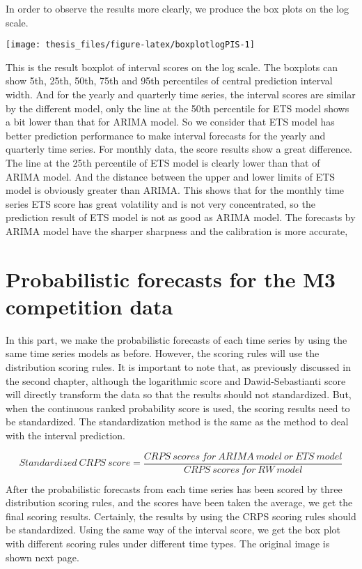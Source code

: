 \documentclass{monashthesis}
\theoremstyle{definition}
\theoremstyle{definition}
\theoremstyle{definition}
\theoremstyle{remark}
\begin{document}
In order to observe the results more clearly, we produce the box plots
on the log scale.

\texttt{[image: thesis\_files/figure-latex/boxplotlogPIS-1]}

This is the result boxplot of interval scores on the log scale. The
boxplots can show 5th, 25th, 50th, 75th and 95th percentiles of central
prediction interval width. And for the yearly and quarterly time series,
the interval scores are similar by the different model, only the line at
the 50th percentile for ETS model shows a bit lower than that for ARIMA
model. So we consider that ETS model has better prediction performance
to make interval forecasts for the yearly and quarterly time series. For
monthly data, the score results show a great difference. The line at the
25th percentile of ETS model is clearly lower than that of ARIMA model.
And the distance between the upper and lower limits of ETS model is
obviously greater than ARIMA. This shows that for the monthly time
series ETS score has great volatility and is not very concentrated, so
the prediction result of ETS model is not as good as ARIMA model. The
forecasts by ARIMA model have the sharper sharpness and the calibration
is more accurate,

\section{Probabilistic forecasts for the M3 competition
data}\label{probabilistic-forecasts-for-the-m3-competition-data}

In this part, we make the probabilistic forecasts of each time series by
using the same time series models as before. However, the scoring rules
will use the distribution scoring rules. It is important to note that,
as previously discussed in the second chapter, although the logarithmic
score and Dawid-Sebastianti score will directly transform the data so
that the results should not standardized. But, when the continuous
ranked probability score is used, the scoring results need to be
standardized. The standardization method is the same as the method to
deal with the interval prediction.

\[Standardized~CRPS~score=\frac{CRPS~scores~for~ARIMA~model~or~ETS~model}{CRPS~scores~for~RW~model}\]

After the probabilistic forecasts from each time series has been scored
by three distribution scoring rules, and the scores have been taken the
average, we get the final scoring results. Certainly, the results by
using the CRPS scoring rules should be standardized. Using the same way
of the interval score, we get the box plot with different scoring rules
under different time types. The original image is shown next page.
\end{document}
